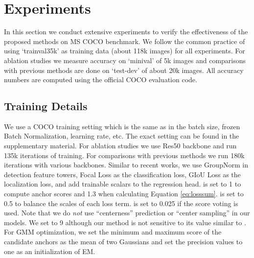\documentclass[runningheads]{llncs}
\begin{document}
\section{Experiments}
\label{experiments}
In this section we conduct extensive experiments to verify the effectiveness of the proposed methods on MS COCO benchmark\cite{coco}. We follow the common practice of using `trainval35k' as training data (about 118k images) for all experiments. For ablation studies we measure accuracy on `minival' of 5k images and comparisons with previous methods are done on `test-dev' of about 20k images. All accuracy numbers are computed using the official COCO evaluation code.

\subsection{Training Details}
We use a COCO training setting which is the same as \cite{atss} in the batch size, frozen Batch Normalization, learning rate, etc. The exact setting can be found in the supplementary material. For ablation studies we use Res50 backbone and run 135k iterations of training. For comparisons with previous methods we run 180k iterations with various backbones. Similar to recent works\cite{fcos, atss}, we use GroupNorm\cite{groupnorm} in detection feature towers, Focal Loss\cite{focal} as the classification loss, GIoU Loss\cite{giou} as the localization loss, and add trainable scalars to the regression head.  is set to 1 to compute anchor scores and 1.3 when calculating Equation \ref{eq:losssum}.  is set to 0.5 to balance the scales of each loss term.  is set to 0.025 if the score voting is used. Note that we do \textit{not} use ``centerness'' prediction or ``center sampling''\cite{fcos, atss} in our models. We set  to 9 although our method is not sensitive to its value similar to \cite{atss}. For GMM optimization, we set the minimum and maximum score of the candidate anchors as the mean of two Gaussians and set the precision values to one as an initialization of EM.
\end{document}
